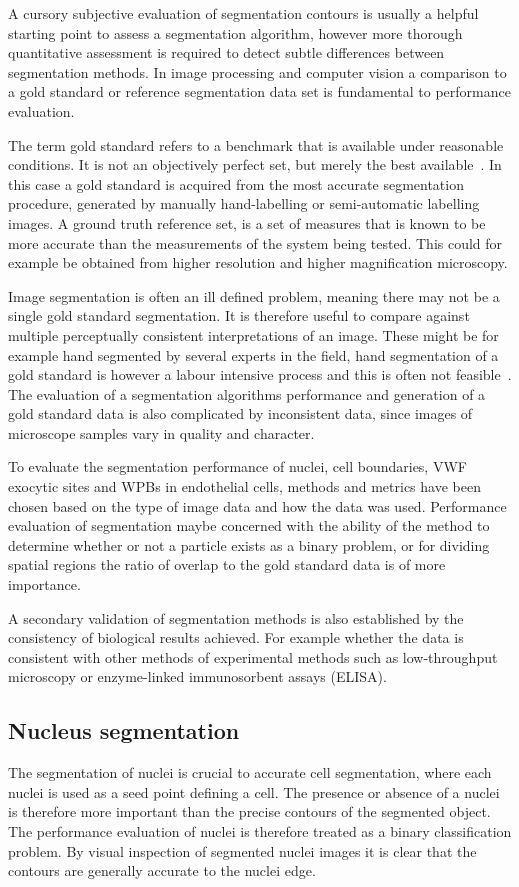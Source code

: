 A cursory subjective evaluation of segmentation contours is usually a helpful starting point to assess a segmentation algorithm, however more thorough quantitative assessment is required to detect subtle differences between segmentation methods. In image processing and computer vision a comparison to a gold standard or reference segmentation data set is fundamental to performance evaluation.

The term gold standard refers to a benchmark that is available under reasonable conditions. It is not an objectively perfect set, but merely the best available~\cite{Cardoso2014}. In this case a gold standard is acquired from the most accurate segmentation procedure, generated by manually hand-labelling or semi-automatic labelling images. A ground truth reference set, is a set of measures that is known to be more accurate than the measurements of the system being tested. This could for example be obtained from higher resolution and higher magnification microscopy.

Image segmentation is often an ill defined problem, meaning there may not be a single gold standard segmentation. It is therefore useful to compare against multiple perceptually consistent interpretations of an image. These might be for example hand segmented by several experts in the field, hand segmentation of a gold standard is however a labour intensive process and this is often not feasible~\cite{Unnikrishnan2005}. The evaluation of a segmentation algorithms performance and generation of a gold standard data is also complicated by inconsistent data, since images of microscope samples vary in quality and character.

To evaluate the segmentation performance of nuclei, cell boundaries, VWF exocytic sites and WPBs in endothelial cells, methods and metrics have been chosen based on the type of image data and how the data was used. Performance evaluation of segmentation maybe concerned with the ability of the method to determine whether or not a particle exists as a binary problem, or for dividing spatial regions the ratio of overlap to the gold standard data is of more importance.

A secondary validation of segmentation methods is also established by the consistency of biological results achieved. For example whether the data is consistent with other methods of experimental methods such as low-throughput microscopy or enzyme-linked immunosorbent assays (ELISA).

\subsection{Nucleus segmentation}
\label{endothelial_morphometry:performance_evaluation:nucleus}
The segmentation of nuclei is crucial to accurate cell segmentation, where each nuclei is used as a seed point defining a cell. The presence or absence of a nuclei is therefore more important than the precise contours of the segmented object. The performance evaluation of nuclei is therefore treated as a binary classification problem. By visual inspection of segmented nuclei images it is clear that the contours are generally accurate to the nuclei edge.

